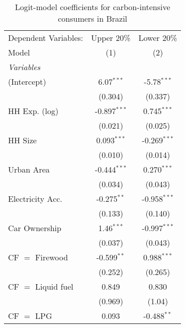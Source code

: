 
\begin{table}[htbp!]
   \centering
   \small
   \begin{adjustbox}{width = 1\textwidth, max height = 0.95\textheight, center}
      \begin{threeparttable}[b]
         \caption{\label{tab:Logit_1_BRA} Logit-model coefficients for carbon-intensive consumers in Brazil}
         \begin{tabular}{lcc}
            \tabularnewline \midrule \midrule
            Dependent Variables: & Upper 20\%     & Lower 20\%\\   
            Model                & (1)            & (2)\\  
            \midrule
            \emph{Variables}\\
            (Intercept)          & 6.07$^{***}$   & -5.78$^{***}$\\   
                                 & (0.304)        & (0.337)\\   
            HH Exp. (log)        & -0.897$^{***}$ & 0.745$^{***}$\\   
                                 & (0.021)        & (0.025)\\   
            HH Size              & 0.093$^{***}$  & -0.269$^{***}$\\   
                                 & (0.010)        & (0.014)\\   
            Urban Area           & -0.444$^{***}$ & 0.270$^{***}$\\   
                                 & (0.034)        & (0.043)\\   
            Electricity Acc.     & -0.275$^{**}$  & -0.958$^{***}$\\   
                                 & (0.133)        & (0.140)\\   
            Car Ownership        & 1.46$^{***}$   & -0.997$^{***}$\\   
                                 & (0.037)        & (0.043)\\   
            CF $=$ Firewood      & -0.599$^{**}$  & 0.988$^{***}$\\   
                                 & (0.252)        & (0.265)\\   
            CF $=$ Liquid fuel   & 0.849          & 0.830\\   
                                 & (0.969)        & (1.04)\\   
            CF $=$ LPG           & 0.093          & -0.488$^{**}$\\   

\end{tabular}
\end{threeparttable}
\end{adjustbox}
\end{table}
